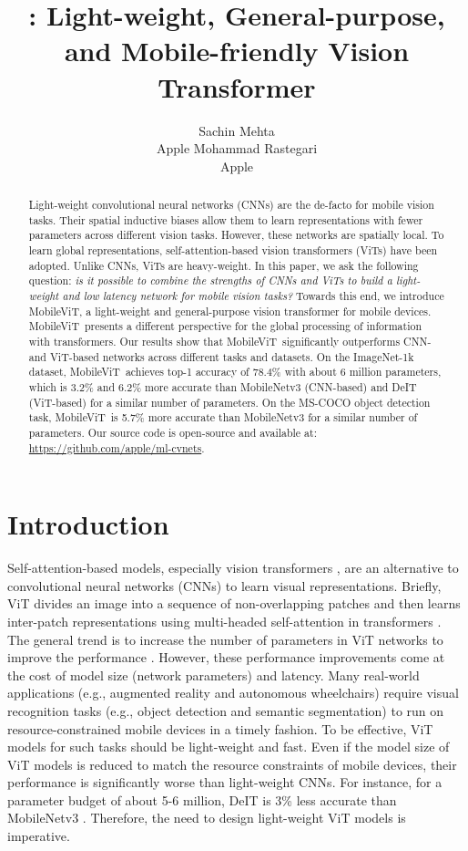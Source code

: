 \documentclass[preprint]{article} \usepackage{iclr2022_conference,times}
\title{\arch: Light-weight, General-purpose, and Mobile-friendly Vision Transformer}
\author{Sachin Mehta \\
Apple
\And
Mohammad Rastegari\\
Apple
}
\newcommand{\arch}{MobileViT}
\begin{document}
\maketitle

\begin{abstract}
Light-weight convolutional neural networks (CNNs) are the de-facto for mobile vision tasks. Their spatial inductive biases allow them to learn representations with fewer parameters across different vision tasks. However, these networks are spatially local. To learn global representations, self-attention-based vision transformers (ViTs) have been adopted. Unlike CNNs, ViTs are heavy-weight. In this paper, we ask the following question: \emph{is it possible to combine the strengths of CNNs and ViTs to build a light-weight and low latency network for mobile vision tasks?} Towards this end, we introduce \arch, a light-weight and general-purpose vision transformer for mobile devices. \arch~presents a different perspective for the global processing of information with transformers. Our results show that \arch~significantly outperforms CNN- and ViT-based networks across different tasks and datasets. On the ImageNet-1k dataset, \arch~achieves top-1 accuracy of 78.4\% with about 6 million parameters, which is 3.2\% and 6.2\% more accurate than MobileNetv3 (CNN-based) and DeIT (ViT-based) for a similar number of parameters. On the MS-COCO object detection task, \arch~is 5.7\% more accurate than MobileNetv3 for a similar number of parameters. Our source code is open-source and available at: \url{https://github.com/apple/ml-cvnets}.
\end{abstract}

\section{Introduction}
Self-attention-based models, especially vision transformers \citep[ViTs; Figure \ref{fig:vit};][]{dosovitskiy2020image}, are an alternative to convolutional neural networks (CNNs) to learn visual representations. Briefly, ViT divides an image into a sequence of non-overlapping patches and then learns inter-patch representations using multi-headed self-attention in transformers \citep{vaswani2017attention}. The general trend is to increase the number of parameters in ViT networks to improve the performance \citep[e.g.,][]{touvron2021training, graham2021levit, wu2021cvt}. However, these performance improvements come at the cost of model size (network parameters) and latency. Many real-world applications (e.g., augmented reality and autonomous wheelchairs) require visual recognition tasks (e.g., object detection and semantic segmentation) to run on resource-constrained mobile devices in a timely fashion. To be effective, ViT models for such tasks should be light-weight and fast. Even if the model size of ViT models is reduced to match the resource constraints of mobile devices, their performance is significantly worse than light-weight CNNs. For instance, for a parameter budget of about 5-6 million, DeIT \citep{touvron2021training} is 3\% less accurate than MobileNetv3 \citep{howard2019searching}. Therefore, the need to design light-weight ViT models is imperative.
\end{document}

